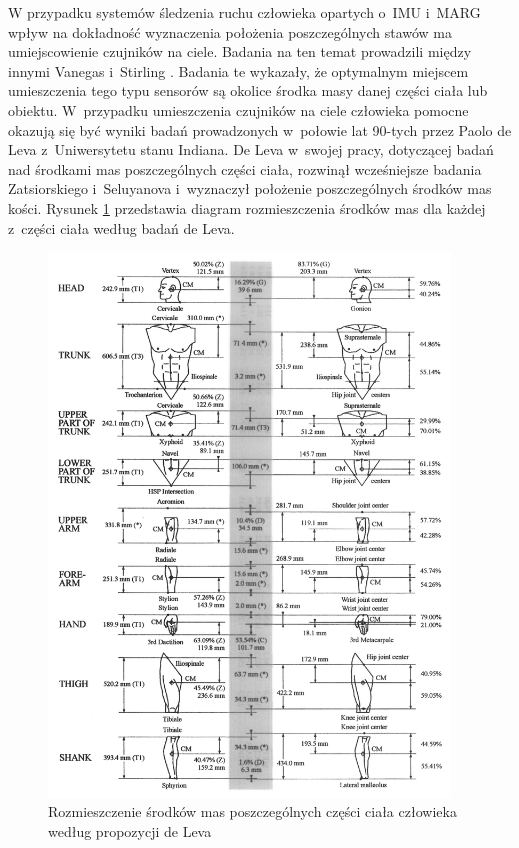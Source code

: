W przypadku systemów śledzenia ruchu człowieka opartych o~IMU i~MARG wpływ na dokładność wyznaczenia położenia poszczególnych stawów ma umiejscowienie czujników na ciele. Badania na ten temat prowadzili między innymi Vanegas i~Stirling \cite{Vanegas2015}. Badania te wykazały, że optymalnym miejscem umieszczenia tego typu sensorów są okolice środka masy danej części ciała lub obiektu. W~przypadku umieszczenia czujników na ciele człowieka pomocne okazują się być wyniki badań prowadzonych w~połowie lat 90-tych przez Paolo de Leva z~Uniwersytetu stanu Indiana. De Leva w~swojej pracy, dotyczącej badań nad środkami mas poszczególnych części ciała\cite{DeLeva1996}, rozwinął wcześniejsze badania Zatsiorskiego i~Seluyanova \cite{549} i~wyznaczył położenie poszczególnych środków mas kości. Rysunek \ref{fig:centerOfMass} przedstawia diagram rozmieszczenia środków mas dla każdej z~części ciała według badań de Leva.
							
\begin{savenotes}
	\begin{figure}[!htb]
		\centering	
		\includegraphics[width=0.95\textwidth]{images/centerOfMass.png}
		\caption[Rozmieszczenie środków mas poszczególnych części ciała człowieka według propozycji de Leva]{Rozmieszczenie środków mas poszczególnych części ciała człowieka według propozycji de Leva\cite{DeLeva1996}}	
		\label{fig:centerOfMass}	
	\end{figure}
\end{savenotes}
									
